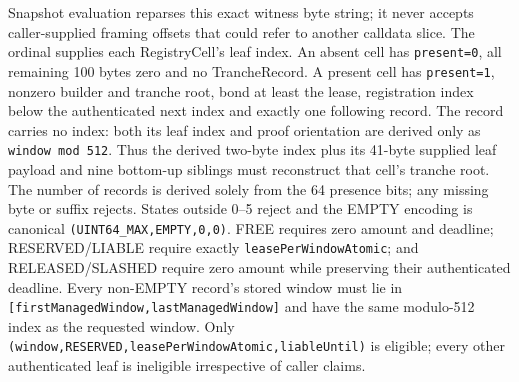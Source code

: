 \documentclass[a4paper,11pt]{article}
\newcommand{\code}[1]{\nolinkurl{#1}}
\begin{document}
Snapshot evaluation reparses this exact witness byte string; it never accepts
caller-supplied framing offsets that could refer to another calldata slice.
The ordinal supplies each RegistryCell's leaf index.  An absent cell has
\code{present=0}, all remaining 100 bytes zero and no TrancheRecord.  A present
cell has \code{present=1}, nonzero builder and tranche root, bond at least the
lease, registration index below the authenticated next index and exactly one
following record.  The record carries no index: both its leaf index and proof
orientation are derived only as \code{window mod 512}.  Thus the derived
two-byte index plus its 41-byte supplied leaf payload and nine bottom-up
siblings must reconstruct that cell's
tranche root.  The number of records is derived solely from the 64 presence
bits; any missing byte or suffix rejects.  States outside 0--5 reject and the
EMPTY encoding is canonical
\code{(UINT64_MAX,EMPTY,0,0)}.  FREE requires zero amount and deadline;
RESERVED/LIABLE require exactly \code{leasePerWindowAtomic}; and
RELEASED/SLASHED require zero amount while preserving their authenticated
deadline.  Every non-EMPTY record's stored window must lie in
\code{[firstManagedWindow,lastManagedWindow]} and have the same modulo-512
index as the requested window.  Only
\code{(window,RESERVED,leasePerWindowAtomic,liableUntil)} is eligible; every
other authenticated leaf is ineligible irrespective of caller claims.
\end{document}
